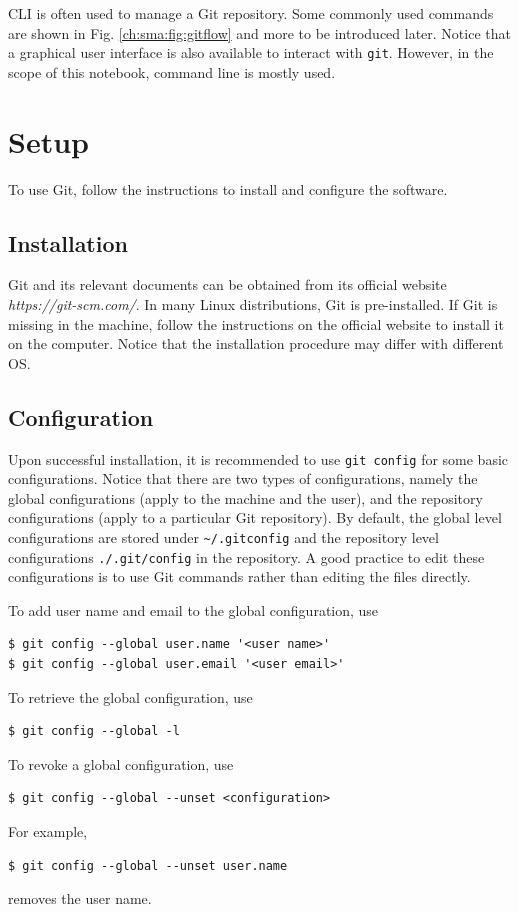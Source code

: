 CLI is often used to manage a Git repository. Some commonly used commands are shown in Fig. \ref{ch:sma:fig:gitflow} and more to be introduced later. Notice that a graphical user interface is also available to interact with \verb|git|. However, in the scope of this notebook, command line is mostly used.

\section{Setup}

To use Git, follow the instructions to install and configure the software.

\subsection{Installation}

Git and its relevant documents can be obtained from its official website \textit{https://git-scm.com/}. In many Linux distributions, Git is pre-installed. If Git is missing in the machine, follow the instructions on the official website to install it on the computer. Notice that the installation procedure may differ with different OS.

\subsection{Configuration}

Upon successful installation, it is recommended to use \verb|git config| for some basic configurations. Notice that there are two types of configurations, namely the global configurations (apply to the machine and the user), and the repository configurations (apply to a particular Git repository). By default, the global level configurations are stored under \verb|~/.gitconfig| and the repository level configurations \verb|./.git/config| in the repository. A good practice to edit these configurations is to use Git commands rather than editing the files directly.

To add user name and email to the global configuration, use
\begin{lstlisting}
$ git config --global user.name '<user name>'
$ git config --global user.email '<user email>'
\end{lstlisting}
To retrieve the global configuration, use
\begin{lstlisting}
$ git config --global -l
\end{lstlisting}
To revoke a global configuration, use
\begin{lstlisting}
$ git config --global --unset <configuration>
\end{lstlisting}
For example,
\begin{lstlisting}
$ git config --global --unset user.name
\end{lstlisting}
removes the user name.

